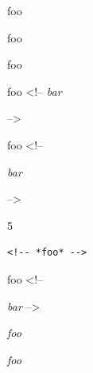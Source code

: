 
\def\mytitle{HTML Comments}


foo 

foo 

foo 

foo <!--
\emph{bar}

-->

foo <!--

\emph{bar}

-->

5

\begin{verbatim}
<!-- *foo* -->
\end{verbatim}

foo <!--

\emph{bar} -->

\emph{foo}

\emph{foo}


